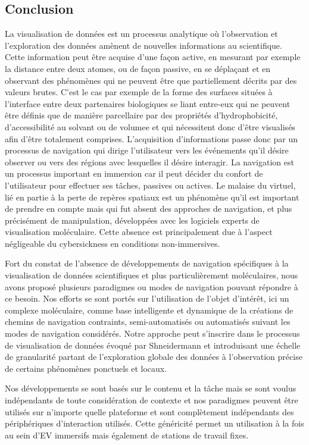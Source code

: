 \subsection{Conclusion}

La visualisation de données est un processus analytique où l'observation et l'exploration des données amènent de nouvelles informations au scientifique. Cette information peut être acquise d'une façon active, en mesurant par exemple la distance entre deux atomes, ou de façon passive, en se déplaçant et en observant des phénomènes qui ne peuvent être que partiellement décrits par des valeurs brutes. C'est le cas par exemple de la forme des surfaces situées à l'interface entre deux partenaires biologiques se liant entre-eux qui ne peuvent être définis que de manière parcellaire par des propriétés d'hydrophobicité, d'accessibilité au solvant ou de volumee et qui nécessitent donc d'être visualisés afin d'être totalement comprises. L'acquisition d'informations passe donc par un processus de navigation qui dirige l'utilisateur vers les événements qu'il désire observer ou vers des régions avec lesquelles il désire interagir. La navigation est un processus important en immersion car il peut décider du confort de l'utilisateur pour effectuer ses tâches, passives ou actives. Le malaise du virtuel, lié en partie à la perte de repères spatiaux est un phénomène qu'il est important de prendre en compte mais qui fut absent des approches de navigation, et  plus précisément de manipulation, développées avec les logiciels experts de visualisation moléculaire. Cette absence est principalement due à l'aspect négligeable du cybersickness en conditions non-immersives.

Fort du constat de l'absence de développements de navigation spécifiques à la visualisation de données scientifiques et plus particulièrement moléculaires, nous avons proposé plusieurs paradigmes ou modes de navigation pouvant répondre à ce besoin. Nos efforts se sont portés sur l'utilisation de l'objet d'intérêt, ici un complexe moléculaire, comme base intelligente et dynamique de la créations de chemins de navigation contraints, semi-automatisés ou automatisés suivant les modes de navigation considérés. Notre approche peut s'inscrire dans le processus de visualisation de données évoqué par Shneidermann et introduisant une échelle de granularité partant de l'exploration globale des données à l'observation précise de certains phénomènes ponctuels et locaux.

Nos développements se sont basés sur le contenu et la tâche mais se sont voulus indépendants de toute considération de contexte et nos paradigmes peuvent être utilisés sur n'importe quelle plateforme et sont complètement indépendants des périphériques d'interaction utilisés. Cette généricité permet un utilisation à la fois au sein d'EV immersifs mais également de stations de travail fixes.

